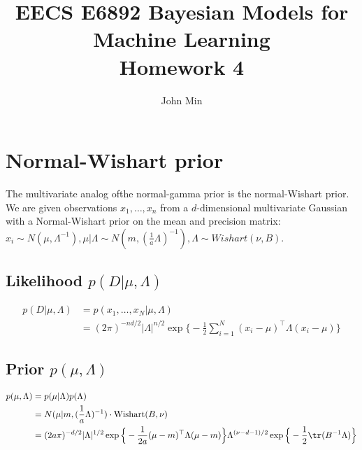 \documentclass{article}
\author{John Min}
\title{EECS E6892 Bayesian Models for Machine Learning \\ Homework 4}
\begin{document}
\maketitle

\newpage
\section{Normal-Wishart prior}

\noindent
The multivariate analog ofthe normal-gamma prior is the normal-Wishart prior. \\

\noindent
We are given observations $x_1, \ldots, x_n$ from a $d$-dimensional multivariate Gaussian with a Normal-Wishart prior on the mean and precision matrix:  $x_i \sim N(\mu, \Lambda^{-1}), \mu | \Lambda \sim N(m, (\frac{1}{a} \Lambda)^{-1}), \Lambda \sim Wishart(\nu, B).$  \\

\subsection{Likelihood $p(D | \mu, \Lambda)$}
\begin{align*}
p(D | \mu, \Lambda) &= p(x_1, \ldots, x_N | \mu, \Lambda) \\
					&= (2\pi)^{-nd/2} |\Lambda|^{n/2} \exp\Big\{ -\frac{1}{2} \displaystyle \sum_{i=1}^N (x_i - \mu)^\top \Lambda (x_i - \mu) \Big\}
\end{align*}

\subsection{Prior $p(\mu, \Lambda)$}
\begin{align*}
p(\mu, \Lambda) &= p(\mu | \Lambda) p(\Lambda) \\
				&= N(\mu | m, (\frac{1}{a}\Lambda)^{-1}) \cdot \text{Wishart}(B,\nu) \\
				&= (2a \pi)^{-d/2} \vert \Lambda \vert^{1/2} \exp \Big\{-\frac{1}{2a} (\mu-m)^\top \Lambda (\mu-m) \Big\} \Lambda^{(\nu-d-1)/2} \exp \Big\{-\frac{1}{2} \tr(B^{-1}\Lambda) \Big \}
\end{align*}
\end{document}

